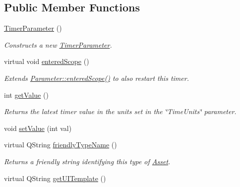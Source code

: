 \subsection*{Public Member Functions}
\begin{DoxyCompactItemize}
\item 
\hyperlink{class_picto_1_1_timer_parameter_aa85d650813b0cac88e0f231138292a0e}{Timer\-Parameter} ()
\begin{DoxyCompactList}\small\item\em Constructs a new \hyperlink{class_picto_1_1_timer_parameter}{Timer\-Parameter}. \end{DoxyCompactList}\item 
\hypertarget{class_picto_1_1_timer_parameter_a2712c0801cfb957685e89fd7cfafe665}{virtual void \hyperlink{class_picto_1_1_timer_parameter_a2712c0801cfb957685e89fd7cfafe665}{entered\-Scope} ()}\label{class_picto_1_1_timer_parameter_a2712c0801cfb957685e89fd7cfafe665}

\begin{DoxyCompactList}\small\item\em Extends \hyperlink{class_picto_1_1_scriptable_ad1945e93d9ebf6cb1f1b8d0a400b73c5}{Parameter\-::entered\-Scope()} to also restart this timer. \end{DoxyCompactList}\item 
int \hyperlink{class_picto_1_1_timer_parameter_a9a6e24c716f84e5d5b89ccee753d8a5f}{get\-Value} ()
\begin{DoxyCompactList}\small\item\em Returns the latest timer value in the units set in the \char`\"{}\-Time\-Units\char`\"{} parameter. \end{DoxyCompactList}\item 
void \hyperlink{class_picto_1_1_timer_parameter_aa5cbef48b93232e80304b8aec10c26d6}{set\-Value} (int val)
\item 
virtual Q\-String \hyperlink{class_picto_1_1_timer_parameter_a76af2957d25d0197a32d4d207f51b3c2}{friendly\-Type\-Name} ()
\begin{DoxyCompactList}\small\item\em Returns a friendly string identifying this type of \hyperlink{class_picto_1_1_asset}{Asset}. \end{DoxyCompactList}\item 
\hypertarget{class_picto_1_1_timer_parameter_a6a9d0f3b463058591cb13d0a6cf41dee}{virtual Q\-String \hyperlink{class_picto_1_1_timer_parameter_a6a9d0f3b463058591cb13d0a6cf41dee}{get\-U\-I\-Template} ()}\label{class_picto_1_1_timer_parameter_a6a9d0f3b463058591cb13d0a6cf41dee}


\end{DoxyCompactItemize}

